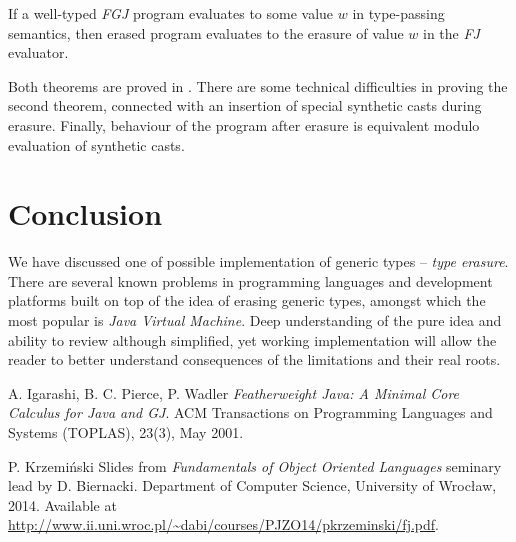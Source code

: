 \documentclass{article}[12pt]
\begin{document}
\begin{theorem}
If a well-typed \emph{FGJ} program evaluates to some value $w$
in type-passing semantics, then erased program evaluates to
the erasure of value $w$ in the \emph{FJ} evaluator.
\end{theorem}

Both theorems are proved in \cite{fj}. There are some technical
difficulties in proving the second theorem, connected with an
insertion of special synthetic casts during erasure. Finally,
behaviour of the program after erasure is equivalent modulo
evaluation of synthetic casts.

\section{Conclusion}

We have discussed one of possible implementation of generic
types -- \emph{type erasure}. There are several known problems
in programming languages and development platforms built on top
of the idea of erasing generic types, amongst which the most
popular is \emph{Java Virtual Machine}. Deep understanding of
the pure idea and ability to review although simplified,
yet working implementation will allow the reader to better
understand consequences of the limitations and their real roots. 

\begin{thebibliography}{1}

   A. Igarashi, B. C. Pierce, P. Wadler
  {\em Featherweight Java: A Minimal Core Calculus for Java and GJ}.
  ACM Transactions on Programming Languages and Systems (TOPLAS), 23(3), May 2001.

   P. Krzemiński Slides from {\em Fundamentals of
  Object Oriented Languages} seminary lead by D. Biernacki.
  Department of Computer Science, University of Wrocław, 2014.
  Available at
  \url{http://www.ii.uni.wroc.pl/~dabi/courses/PJZO14/pkrzeminski/fj.pdf}.

\end{thebibliography}
\end{document}
